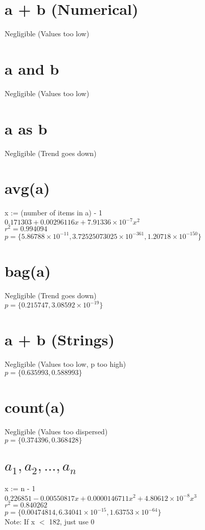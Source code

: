 \documentclass[12pt]{article}
\begin{document}
	\section{a + b (Numerical)}
	Negligible (Values too low)
	
	\section{a and b}
	Negligible (Values too low)
	
	\section{a as b}
	Negligible (Trend goes down)
	
	\section{avg(a)}
	x := (number of items in a) - 1\\
	$0.171303 + 0.00296116x + 7.91336 \times 10^{-7} x^2$\\
	$r^2 = 0.994094$\\
	$p = \{5.86788 \times 10^{-11}, 3.72525073025 \times 10^{-361}, 1.20718 \times 10^{-150}\}$

	\section{bag(a)}
	Negligible (Trend goes down)\\
	$p = \{0.215747, 3.08592 \times 10^{-19}\}$
	
	\section{a + b (Strings)}
	Negligible (Values too low, p too high)\\
	$p = \{0.635993, 0.588993\}$
	
	\section{count(a)}
	Negligible (Values too dispersed)\\
	$p = \{0.374396, 0.368428\}$
	
	\section{$a_1, a_2, ..., a_n$}
	x := n - 1\\
	$0.226851 - 0.00550817x + 0.0000146711x^2 + 4.80612 \times 10^{-8} x^3$\\
	$r^2 = 0.840262$\\
	$p = \{0.00474814, 6.34041 \times 10^{-15}, 1.63753 \times 10^{-64}\}$\\
	Note: If x $<$ 182, just use 0
	
\end{document}
